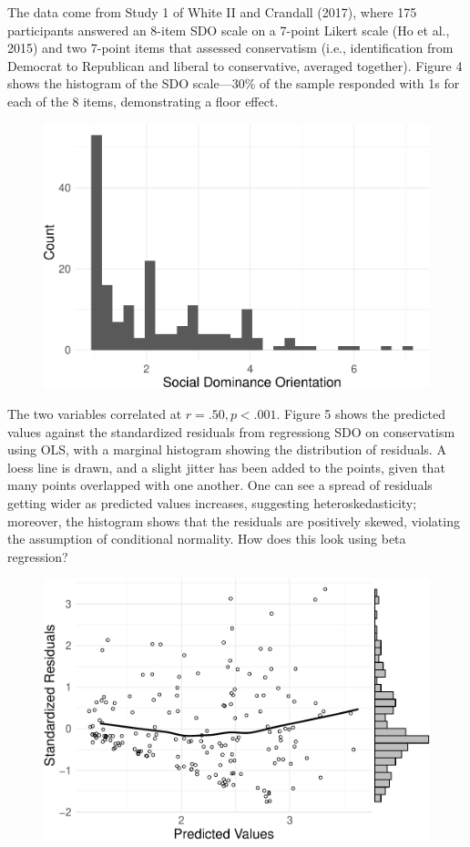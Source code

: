 \documentclass[english,man]{apa6}
\theoremstyle{definition}
\theoremstyle{definition}
\theoremstyle{remark}
\begin{document}
The data come from Study 1 of White II and Crandall (2017), where 175
participants answered an 8-item SDO scale on a 7-point Likert scale (Ho
et al., 2015) and two 7-point items that assessed conservatism (i.e.,
identification from Democrat to Republican and liberal to conservative,
averaged together). Figure 4 shows the histogram of the SDO scale---30\%
of the sample responded with 1s for each of the 8 items, demonstrating a
floor effect.

\begin{figure}
\centering
\includegraphics{beta_hurdle_files/figure-latex/unnamed-chunk-11-1.pdf}
\caption{}
\end{figure}

The two variables correlated at \(r = .50, p < .001\). Figure 5 shows
the predicted values against the standardized residuals from regressiong
SDO on conservatism using OLS, with a marginal histogram showing the
distribution of residuals. A loess line is drawn, and a slight jitter
has been added to the points, given that many points overlapped with one
another. One can see a spread of residuals getting wider as predicted
values increases, suggesting heteroskedasticity; moreover, the histogram
shows that the residuals are positively skewed, violating the assumption
of conditional normality. How does this look using beta regression?

\begin{figure}
\centering
\includegraphics{beta_hurdle_files/figure-latex/unnamed-chunk-12-1.pdf}
\caption{}
\end{figure}
\end{document}
